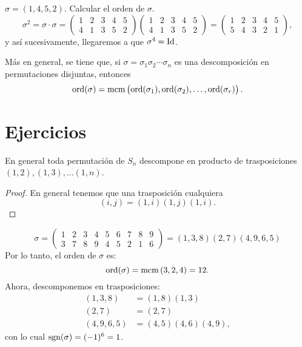 \begin{example}
    $\sigma = (1, 4, 5, 2)$. Calcular el orden de $\sigma$.
    \[
        \sigma^2 = \sigma \cdot \sigma =
        \begin{pmatrix}
            1 & 2 & 3 & 4 & 5 \\
            4 & 1 & 3 & 5 &2
        \end{pmatrix}
        \begin{pmatrix}
            1 & 2 & 3 & 4 & 5 \\
            4 & 1 & 3 & 5 & 2
        \end{pmatrix} = 
        \begin{pmatrix}
            1 & 2 & 3 & 4 & 5 \\
            5 & 4 & 3 & 2 & 1
        \end{pmatrix},
    \]
    y así sucesivamente, llegaremos a que $\sigma^4 = \operatorname{Id}$.
\end{example}

\begin{prop}
Más en general, se tiene que, si $\sigma = \sigma_1 \sigma_2 \cdots \sigma_n$ es una descomposición en permutaciones disjuntas, entonces
\[
    \operatorname{ord}(\sigma) = \operatorname{mcm} \left( \operatorname{ord} (\sigma_1), \operatorname{ord}(\sigma_2), \dots, \operatorname{ord}(\sigma_r) \right).
\]
\end{prop}

\section{Ejercicios}

\begin{ej} %
    En general toda permutación de $S_n$ descompone en producto de trasposiciones
    $(1, 2), (1, 3), \dots (1, n)$.
\end{ej}

\begin{proof}
    En general tenemos que una trasposición cualquiera
    \[
        (i, j) = (1, i)(1, j)(1,i).
    \]
\end{proof}

\begin{ej}
    \[
        \sigma =
        \begin{pmatrix}
            1 & 2 & 3 & 4 & 5 & 6 & 7 & 8 & 9 \\
            3 & 7 & 8 & 9 & 4 & 5 & 2 & 1 & 6
        \end{pmatrix}
        = (1, 3, 8) (2, 7) (4, 9, 6, 5)
    \]
    Por lo tanto, el orden de $\sigma$ es:
    \[
        \operatorname{ord}(\sigma) = \operatorname{mcm}\left( 3, 2, 4 \right) = 12.
    \]
    Ahora, descomponemos en trasposiciones:
    \[
        \begin{aligned}
            (1, 3, 8) &= (1, 8) (1, 3) \\
            (2, 7) &= (2, 7) \\
            (4, 9, 6, 5) &= (4, 5) (4, 6) (4, 9),
        \end{aligned}
    \]
    con lo cual $\text{sgn}(\sigma) = (-1)^6 = 1$.
\end{ej}

